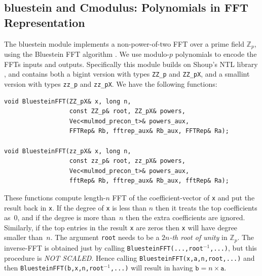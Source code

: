 \documentclass[14pt]{extarticle}
\newcommand{\Z}{\mathbb{Z}}
\def\bluestein{\textsf{bluestein}}
\def\Cmodulus{\textsf{Cmodulus}}
\begin{document}
\subsection{{\bluestein} and {\Cmodulus}: Polynomials in FFT Representation}
\label{sec:bluestein} \label{sec:Cmodulus}
The {\bluestein} module implements a non-power-of-two FFT over a prime
field $\Z_p$, using the Bluestein FFT algorithm \cite{bluestein}. We
use modulo-$p$ polynomials to encode the FFTs inputs and outputs.
Specifically this module builds on Shoup's NTL library \cite{NTL},
and contains both a bigint version with types \texttt{ZZ\_p} and
\texttt{ZZ\_pX}, and a smallint version with types \texttt{zz\_p}
and \texttt{zz\_pX}.
We have the following functions:
\begin{verbatim}
void BluesteinFFT(ZZ_pX& x, long n,
                  const ZZ_p& root, ZZ_pX& powers, 
                  Vec<mulmod_precon_t>& powers_aux, 
                  FFTRep& Rb, fftrep_aux& Rb_aux, FFTRep& Ra);

void BluesteinFFT(zz_pX& x, long n,
                  const zz_p& root, zz_pX& powers, 
                  Vec<mulmod_precon_t>& powers_aux, 
                  fftRep& Rb, fftrep_aux& Rb_aux, fftRep& Ra);
\end{verbatim}
These functions compute length-$n$ FFT of the coefficient-vector of
\texttt{x} and put the result back in \texttt{x}. If the degree of
\texttt{x} is less than $n$ then it treats the top coefficients as~0,
and if the degree is more than~$n$ then the extra coefficients are
ignored. Similarly, if the top entries in the result \texttt{x} are
zeros then \texttt{x} will have degree smaller than~$n$. The argument
\texttt{root} needs to be a \emph{$2n$-th root of unity} in $\Z_p$.
%
The inverse-FFT is obtained just by calling
\texttt{BluesteinFFT(...,root}$^{-1}$\texttt{,...)}, but this
procedure is \emph{NOT SCALED}. Hence calling
\texttt{BluesteinFFT(x,a,n,root,...)} and then 
\texttt{BluesteinFFT(b,x,n,root}$^{-1}$\texttt{,...)} will result
in having $\mathtt{b}=n \times \mathtt{a}$.
\end{document}
